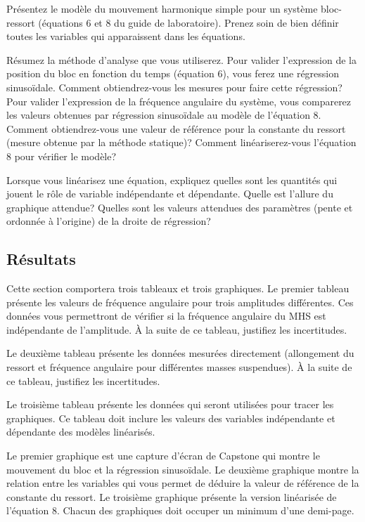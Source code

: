 \documentclass[]{article}
\begin{document}
Présentez le modèle du mouvement harmonique simple pour un système
bloc-ressort (équations 6 et 8 du guide de laboratoire). Prenez soin de
bien définir toutes les variables qui apparaissent dans les équations.

Résumez la méthode d'analyse que vous utiliserez. Pour valider
l'expression de la position du bloc en fonction du temps (équation 6),
vous ferez une régression sinusoïdale. Comment obtiendrez-vous les
mesures pour faire cette régression? Pour valider l'expression de la
fréquence angulaire du système, vous comparerez les valeurs obtenues par
régression sinusoïdale au modèle de l'équation 8. Comment
obtiendrez-vous une valeur de référence pour la constante du ressort
(mesure obtenue par la méthode statique)? Comment linéariserez-vous
l'équation 8 pour vérifier le modèle?

Lorsque vous linéarisez une équation, expliquez quelles sont les
quantités qui jouent le rôle de variable indépendante et dépendante.
Quelle est l'allure du graphique attendue? Quelles sont les valeurs
attendues des paramètres (pente et ordonnée à l'origine) de la droite de
régression?

\hypertarget{ruxe9sultats}{%
\subsection*{Résultats}\label{ruxe9sultats}}

Cette section comportera trois tableaux et trois graphiques. Le premier
tableau présente les valeurs de fréquence angulaire pour trois
amplitudes différentes. Ces données vous permettront de vérifier si la
fréquence angulaire du MHS est indépendante de l'amplitude. À la suite
de ce tableau, justifiez les incertitudes.

Le deuxième tableau présente les données mesurées directement
(allongement du ressort et fréquence angulaire pour différentes masses
suspendues). À la suite de ce tableau, justifiez les incertitudes.

Le troisième tableau présente les données qui seront utilisées pour
tracer les graphiques. Ce tableau doit inclure les valeurs des variables
indépendante et dépendante des modèles linéarisés.

Le premier graphique est une capture d'écran de Capstone qui montre le
mouvement du bloc et la régression sinusoïdale. Le deuxième graphique
montre la relation entre les variables qui vous permet de déduire la
valeur de référence de la constante du ressort. Le troisième graphique
présente la version linéarisée de l'équation 8. Chacun des graphiques
doit occuper un minimum d'une demi-page.
\end{document}
